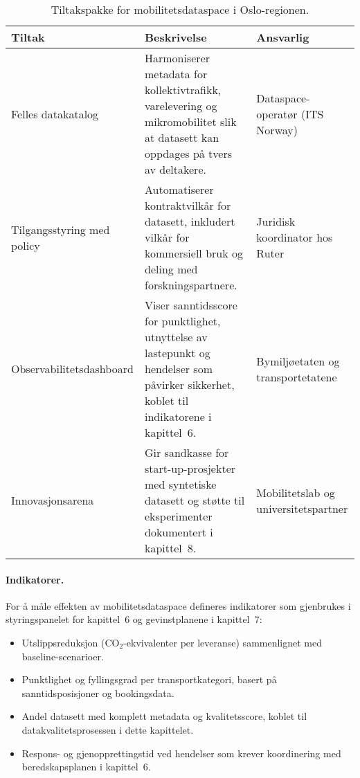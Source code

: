 \begin{table}[ht]
    \centering
    \caption{Tiltakspakke for mobilitetsdataspace i Oslo-regionen.}
    \label{tab:kap03-mobilitet-tiltak}
    \begin{tabular}{p{}p{}p{}}
        \toprule
        \textbf{Tiltak} & \textbf{Beskrivelse} & \textbf{Ansvarlig} \\
        \midrule
        Felles datakatalog & Harmoniserer metadata for kollektivtrafikk, varelevering og mikromobilitet slik at datasett kan
        oppdages på tvers av deltakere. & Dataspace-operatør (ITS Norway) \\
        Tilgangsstyring med policy & Automatiserer kontraktvilkår for datasett, inkludert vilkår for kommersiell bruk og deling
        med forskningspartnere. & Juridisk koordinator hos Ruter \\
        Observabilitetsdashboard & Viser sanntidsscore for punktlighet, utnyttelse av lastepunkt og hendelser som påvirker
        sikkerhet, koblet til indikatorene i kapittel~6. & Bymiljøetaten og transportetatene \\
        Innovasjonsarena & Gir sandkasse for start-up-prosjekter med syntetiske datasett og støtte til
        eksperimenter dokumentert i kapittel~8. & Mobilitetslab og universitetspartner \\
        \bottomrule
    \end{tabular}
\end{table}

\paragraph{Indikatorer.} For å måle effekten av mobilitetsdataspace defineres indikatorer som gjenbrukes i styringspanelet for
kapittel~6 og gevinstplanene i kapittel~7:
\begin{itemize}
    \item Utslippsreduksjon (CO$_2$-ekvivalenter per leveranse) sammenlignet med baseline-scenarioer.
    \item Punktlighet og fyllingsgrad per transportkategori, basert på sanntidsposisjoner og bookingsdata.
    \item Andel datasett med komplett metadata og kvalitetsscore, koblet til datakvalitetsprosessen i dette kapittelet.
    \item Respons- og gjenopprettingstid ved hendelser som krever koordinering med beredskapsplanen i kapittel~6.
\end{itemize}

